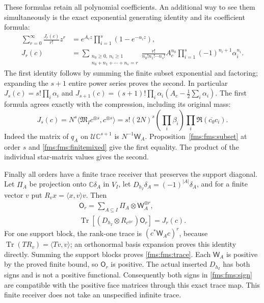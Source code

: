 \documentclass[11pt,a4paper]{article}
\theoremstyle{definition}\newtheorem{definition}[theorem]{Definition}
\newcommand{\C}{\mathbb C}\newcommand{\R}{\mathbb R}
\providecommand{\Tr}{\operatorname{Tr}}
\begin{document}
These formulas retain all polynomial coefficients. An additional
way to see them simultaneously is the exact exponential generating
identity and its coefficient formula:
\begin{equation}\tag{FMS44}\label{fms:fms:generating}
 \begin{split}
 \sum_{r=0}^\infty\frac{J_r(c)}{r!}z^r
     &=e^{A_cz}\prod_{i=1}^s(1-e^{-\alpha_i z}),\\
 J_r(c)&=
 \sum_{\substack{n_0\ge0,\ n_i\ge1\\n_0+n_1+\cdots+n_s=r}}
 \frac{r!}{n_0!n_1!\cdots n_s!}
 A_c^{n_0}\prod_{i=1}^s
                   (-1)^{n_i+1}\alpha_i^{n_i}.
 \end{split}
\end{equation}
The first identity follows by summing the finite subset exponential
and factoring; expanding the $s+1$ entire power series proves the
second. In particular
$J_s(c)=s!\prod_i\alpha_i$ and
$J_{s+1}(c)=(s+1)!\prod_i\alpha_i
             (A_c-\frac12\sum_i\alpha_i)$.
The first formula agrees exactly with the compression, including
its original mass:
\begin{equation}\tag{FMS45}\label{fms:fms:nfactor}
 J_s(c)=N^s
 \langle\mathfrak M_Ic^{\otimes s},c^{\otimes s}\rangle
 =s!(2N)^s\left(\prod_i\beta_i\right)
                  \prod_i\Re(\overline{c_0}c_i).
\end{equation}
Indeed the matrix of $q_A$ on $\mathcal U\C^{s+1}$ is
$N^{-1}\mathsf W_A$. Proposition~\ref{fms:fms:subset} at order $s$
and \eqref{fms:fms:finitemixed} give the first equality. The product
of the individual star-matrix values gives the second.

Finally all orders have a finite trace receiver that preserves the
support diagonal.  Let $\Pi_A$ be projection onto $\C\delta_A$
in $V_I$, let $D_{h_I}\delta_A=(-1)^{|A|}\delta_A$, and for a
finite vector $v$ put $R_vx=\langle x,v\rangle v$. Then
\begin{equation}\tag{FMS46}\label{fms:fms:trace}
 \begin{gathered}
 \mathsf O_r=\sum_{A\subseteq I}\Pi_A\otimes\mathsf W_A^{\otimes r},
 \\
 \Tr\left[(D_{h_I}\otimes R_{c^{\otimes r}})\mathsf O_r\right]
       =J_r(c).
 \end{gathered}
\end{equation}
For one support block, the rank-one trace is
$(c^*\mathsf W_Ac)^r$, because
$\Tr(TR_v)=\langle Tv,v\rangle$; an orthonormal basis expansion
proves this identity directly. Summing the support blocks proves
\eqref{fms:fms:trace}. Each $\mathsf W_A$ is positive by the proved
finite bound, so $\mathsf O_r$ is positive. The actual inserted
$D_{h_I}$ has both signs and is not a positive functional.
Consequently both signs in \eqref{fms:fms:sign} are compatible with
the positive face matrices through this exact trace map.
This finite receiver does not take an unspecified infinite trace.
\end{document}

